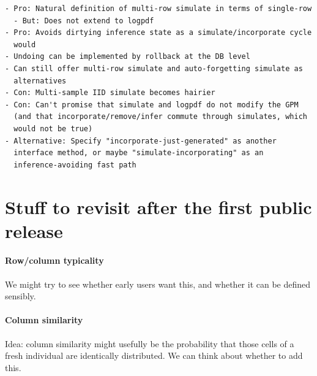 \documentclass[10pt,letterpaper]{article}
\begin{document}
\begin{verbatim}
- Pro: Natural definition of multi-row simulate in terms of single-row
  - But: Does not extend to logpdf
- Pro: Avoids dirtying inference state as a simulate/incorporate cycle
  would
- Undoing can be implemented by rollback at the DB level
- Can still offer multi-row simulate and auto-forgetting simulate as
  alternatives
- Con: Multi-sample IID simulate becomes hairier
- Con: Can't promise that simulate and logpdf do not modify the GPM
  (and that incorporate/remove/infer commute through simulates, which
  would not be true)
- Alternative: Specify "incorporate-just-generated" as another
  interface method, or maybe "simulate-incorporating" as an
  inference-avoiding fast path
\end{verbatim}

\appendix
\section{Stuff to revisit after the first public release}

\paragraph{Row/column typicality}
We might try to see whether early users want this, and whether it can
be defined sensibly.

\paragraph{Column similarity}
Idea: column similarity might usefully be the probability that those
cells of a fresh individual are identically distributed.  We can think
about whether to add this.
\end{document}

